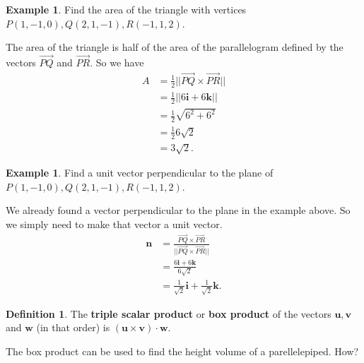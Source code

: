 \documentclass[12pt, letter]{article}
\theoremstyle{plain}
\numberwithin{theorem}{section}
\theoremstyle{definition}
\newtheorem{definition}[theorem]{Definition}
\newtheorem{example}[theorem]{Example}
\begin{document}
\bigskip

\hrulefill

\bigskip

\begin{example}
Find the area of the triangle with vertices $P(1,-1,0), Q(2,1,-1), R(-1,1,2)$.\\

\smallskip

The area of the triangle is half of the area of the parallelogram defined by the vectors $\vec{PQ}$ and $\vec{PR}$. So we have
\begin{align*}
A &= \frac{1}{2} ||\vec{PQ} \times \vec{PR}||\\
&=\frac{1}{2} ||6\bm{i}+6\bm{k}||\\
&= \frac{1}{2} \sqrt{6^2+6^2}\\
&=\frac{1}{2} 6\sqrt{2}\\
&= 3\sqrt{2}.
\end{align*}
\end{example}

\bigskip

\hrulefill

\bigskip

\begin{example}
Find a unit vector perpendicular to the plane of $P(1,-1,0), Q(2,1,-1), R(-1,1,2)$.\\

\smallskip

We already found a vector perpendicular to the plane in the example above. So we simply need to make that vector a unit vector.
\begin{align*}
\bm{n} &= \frac{\vec{PQ} \times \vec{PR}}{||\vec{PQ} \times \vec{PR}||}\\
&= \frac{6\bm{i} + 6\bm{k}}{6\sqrt{2}}\\
&= \frac{1}{\sqrt{2}} \bm{i} + \frac{1}{\sqrt{2}} \bm{k}.
\end{align*}
\end{example}

\bigskip

\hrulefill

\bigskip

\begin{definition}
The \textbf{triple scalar product} or \textbf{box product} of the vectors $\bm{u},\bm{v}$ and $\bm{w}$ (in that order) is $(\bm{u} \times \bm{v}) \cdot \bm{w}$.
\end{definition}

\bigskip

The box product can be used to find the height volume of a parellelepiped. How?
\end{document}
